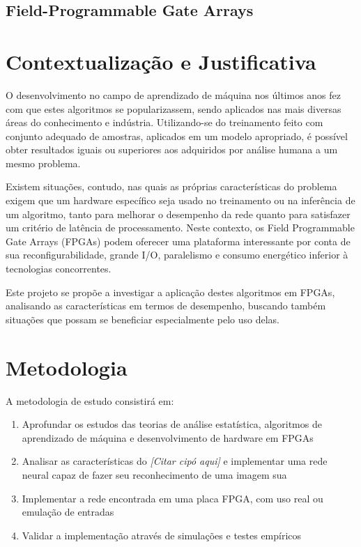 \documentclass[
	12pt,				%
	oneside,			%
	a4paper,			%
	english,			%
	french,				%
	spanish,			%
	brazil,				%
	]{abntex2}
\begin{document}
\section*{Field-Programmable Gate Arrays}


\chapter*[Contextualização e Justificativa]{Contextualização e Justificativa}
O desenvolvimento no campo de aprendizado de máquina nos últimos anos
fez com que estes algoritmos se popularizassem, sendo aplicados nas mais
diversas áreas do conhecimento e indústria. Utilizando-se do treinamento
feito com conjunto adequado de amostras, aplicados em um modelo
apropriado, é possível obter resultados iguais ou superiores aos
adquiridos por análise humana a um mesmo problema.

Existem situações, contudo, nas quais as próprias características do
problema exigem que um hardware específico seja usado no treinamento ou
na inferência de um algoritmo, tanto para melhorar o desempenho da rede
quanto para satisfazer um critério de latência de processamento. Neste
contexto, os Field Programmable Gate Arrays (FPGAs) podem oferecer uma
plataforma interessante por conta de sua reconfigurabilidade, grande
I/O, paralelismo e consumo energético inferior à tecnologias
concorrentes.

Este projeto se propõe a investigar a aplicação destes algoritmos em
FPGAs, analisando as características em termos de desempenho, buscando
também situações que possam se beneficiar especialmente pelo uso delas.



\chapter*[Metodologia]{Metodologia}
A metodologia de estudo consistirá em:
\begin{enumerate}
    \item Aprofundar os estudos das teorias de análise estatística,
      algoritmos de aprendizado de máquina e desenvolvimento de hardware em
      FPGAs
    \item Analisar as características do \textit{[Citar cipó aqui]} e implementar uma rede neural capaz de fazer seu reconhecimento de uma imagem sua
    \item Implementar a rede encontrada em uma placa FPGA, com uso real ou emulação
      de entradas
    \item Validar a implementação através de simulações e testes empíricos
\end{enumerate}
	
\end{document}

